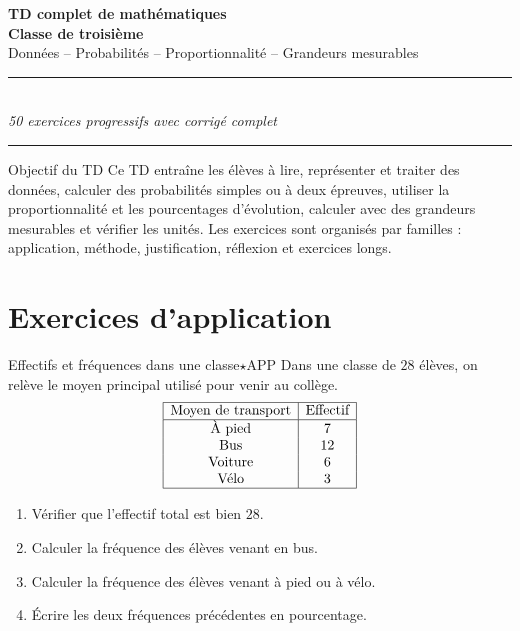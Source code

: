 \documentclass[11pt,a4paper]{article}
\newcounter{exo}
\newcounter{corr}
\begin{document}
\begin{center}
{\Huge \textbf{TD complet de mathématiques}}\\[0.2cm]
{\Large \textbf{Classe de troisième}}\\[0.15cm]
{\Large Données -- Probabilités -- Proportionnalité -- Grandeurs mesurables}\\[0.2cm]
\rule{0.92\linewidth}{0.6pt}\\[0.15cm]
{\itshape 50 exercices progressifs avec corrigé complet}\\[0.15cm]
\rule{0.92\linewidth}{0.6pt}
\end{center}

\begin{bilanbox}{Objectif du TD}
Ce TD entraîne les élèves à lire, représenter et traiter des données, calculer des probabilités simples ou à deux épreuves, utiliser la proportionnalité et les pourcentages d'évolution, calculer avec des grandeurs mesurables et vérifier les unités. Les exercices sont organisés par familles : application, méthode, justification, réflexion et exercices longs.
\end{bilanbox}

\tableofcontents
\newpage

\section{Exercices d'application}

\begin{exobox}{Effectifs et fréquences dans une classe}{$\star$}{APP}
Dans une classe de $28$ élèves, on relève le moyen principal utilisé pour venir au collège.
\[
\begin{array}{|c|c|}
\hline
\text{Moyen de transport} & \text{Effectif} \\
\hline
\text{À pied} & 7 \\
\text{Bus} & 12 \\
\text{Voiture} & 6 \\
\text{Vélo} & 3 \\
\hline
\end{array}
\]
\begin{enumerate}
\item Vérifier que l'effectif total est bien $28$.
\item Calculer la fréquence des élèves venant en bus.
\item Calculer la fréquence des élèves venant à pied ou à vélo.
\item Écrire les deux fréquences précédentes en pourcentage.
\end{enumerate}
\end{exobox}
\end{document}
